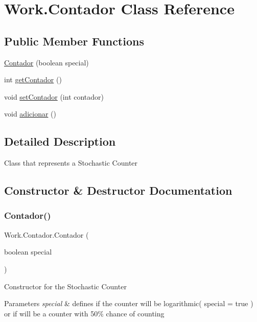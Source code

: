 \hypertarget{classWork_1_1Contador}{}\section{Work.\+Contador Class Reference}
\label{classWork_1_1Contador}
\subsection*{Public Member Functions}
\begin{DoxyCompactItemize}
\item 
\hyperlink{classWork_1_1Contador_a7e640dcd81e94b1be245157b13505cfa}{Contador} (boolean special)
\item 
int \hyperlink{classWork_1_1Contador_ac0ffd5556a2919cb521fcc934e0b4627}{get\+Contador} ()
\item 
void \hyperlink{classWork_1_1Contador_a272543fc47de1795d20af9b20bdd710d}{set\+Contador} (int contador)
\item 
void \hyperlink{classWork_1_1Contador_aef3e8c3204ac3653b6397a4df4aae8b3}{adicionar} ()
\end{DoxyCompactItemize}


\subsection{Detailed Description}
Class that represents a Stochastic Counter 

\subsection{Constructor \& Destructor Documentation}
\mbox{\label{classWork_1_1Contador_a7e640dcd81e94b1be245157b13505cfa}} 
\subsubsection{\texorpdfstring{Contador()}{Contador()}}
{\footnotesize\ttfamily Work.\+Contador.\+Contador (\begin{DoxyParamCaption}\item[{boolean}]{special }\end{DoxyParamCaption})\hspace{0.3cm}{\ttfamily [inline]}}

Constructor for the Stochastic Counter 
\begin{DoxyParams}{Parameters}
{\em special} & defines if the counter will be logarithmic( special = true ) or if will be a counter with 50\% chance of counting \\
\hline
\end{DoxyParams}


